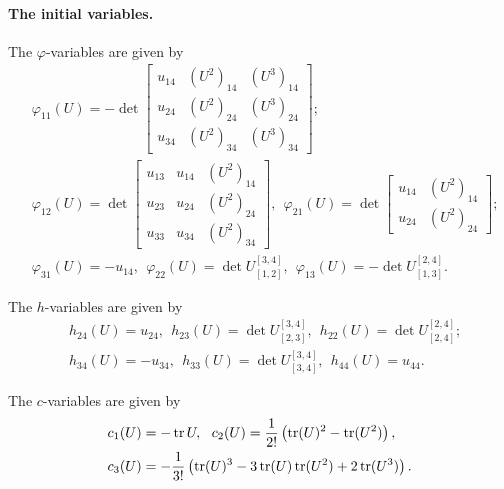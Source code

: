 \paragraph{The initial variables.} The $\varphi$-variables are given by
\begin{align}
    &\varphi_{11}(U) = -\det \begin{bmatrix}
        u_{14} & (U^2)_{14} & (U^3)_{14}\\
        u_{24} & (U^2)_{24} & (U^3)_{24}\\
        u_{34} & (U^2)_{34} & (U^3)_{34}
    \end{bmatrix};\\ &\varphi_{12}(U) =  \det \begin{bmatrix}
        u_{13} & u_{14} & (U^2)_{14}\\
        u_{23} & u_{24} & (U^2)_{24}\\
        u_{33} & u_{34} & (U^2)_{34}
    \end{bmatrix}, \ \ \varphi_{21}(U) = \det \begin{bmatrix}
        u_{14} & (U^2)_{14}\\ u_{24} & (U^2)_{24}
    \end{bmatrix};  \\
    &\varphi_{31}(U) = -u_{14}, \ \ \varphi_{22}(U) = \det U_{[1,2]}^{[3,4]}, \ \ \varphi_{13}(U) = - \det U_{[1,3]}^{[2,4]}.
\end{align}

The $h$-variables are given by
\begin{align}
    &h_{24}(U) = u_{24}, \ \ h_{23}(U) = \det U_{[2,3]}^{[3,4]}, \ \ h_{22}(U) = \det U_{[2,4]}^{[2,4]};\\
    &h_{34}(U) = -u_{34}, \ \ h_{33}(U) = \det U_{[3,4]}^{[3,4]}, \ \ h_{44}(U) = u_{44}.
\end{align}

The $c$-variables are given by
\begin{align}
    &c_1(U) = -\operatorname{tr} U, \ \ c_2(U) = \frac{1}{2!}\left(\operatorname{tr}(U)^2 - \operatorname{tr}(U^2)\right),\\ &c_3(U) = -\frac{1}{3!}\left( \operatorname{tr}(U)^3 - 3\operatorname{tr}(U)\operatorname{tr}(U^2)+2\operatorname{tr}(U^3)\right).
\end{align}

